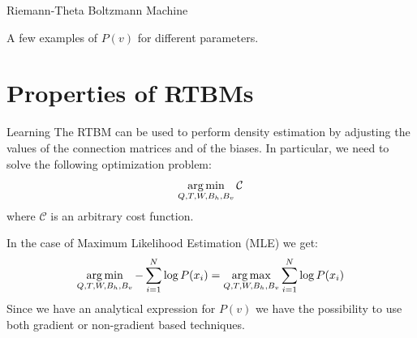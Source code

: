 \documentclass[10pt]{beamer}
\begin{document}
\begin{frame}{Riemann-Theta Boltzmann Machine}
\begin{figure}
\begin{center}
        \end{center}
        \end{figure}
        \begin{center}
            A few examples of $P(v)$ for different parameters.
        \end{center}
       
\end{frame}

\section{Properties of RTBMs}

\begin{frame}{Learning}
    The RTBM can be used to perform density estimation by adjusting the values of the connection matrices and of the biases.
    In particular, we need to solve the following optimization problem:
    \begin{equation*}
        \operatorname*{arg\,min}_{Q,T,W,B_h,B_v} \mathcal{C}
    \end{equation*} 
    where $\mathcal{C}$ is an arbitrary cost function. 

    In the case of Maximum Likelihood Estimation (MLE) we get:
    \begin{equation*}
        \operatorname*{arg\,min}_{Q,T,W,B_h,B_v} - \sum_{i=1}^N \log  P(x_i) = \operatorname*{arg\,max}_{Q,T,W,B_h,B_v} \sum_{i=1}^N \log P(x_i)
    \end{equation*} 
    Since we have an analytical expression for $P(v)$ we have the possibility to use both
    gradient or non-gradient based techniques.


\end{frame}
\end{document}
